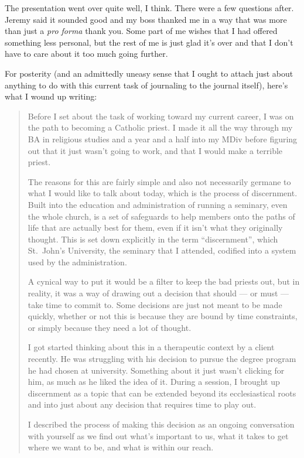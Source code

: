 The presentation went over quite well, I think. There were a few questions after. Jeremy said it sounded good and my boss thanked me in a way that was more than just a \emph{pro forma} thank you. Some part of me wishes that I had offered something less personal, but the rest of me is just glad it's over and that I don't have to care about it too much going further.

For posterity (and an admittedly uneasy sense that I ought to attach just about anything to do with this current task of journaling to the journal itself), here's what I wound up writing:

\begin{quote}
Before I set about the task of working toward my current career, I was on the path to becoming a Catholic priest. I made it all the way through my BA in religious studies and a year and a half into my MDiv before figuring out that it just wasn't going to work, and that I would make a terrible priest.

The reasons for this are fairly simple and also not necessarily germane to what I would like to talk about today, which is the process of discernment. Built into the education and administration of running a seminary, even the whole church, is a set of safeguards to help members onto the paths of life that are actually best for them, even if it isn't what they originally thought. This is set down explicitly in the term ``discernment'', which St.~John's University, the seminary that I attended, codified into a system used by the administration.

A cynical way to put it would be a filter to keep the bad priests out, but in reality, it was a way of drawing out a decision that should --- or must --- take time to commit to. Some decisions are just not meant to be made quickly, whether or not this is because they are bound by time constraints, or simply because they need a lot of thought.

I got started thinking about this in a therapeutic context by a client recently. He was struggling with his decision to pursue the degree program he had chosen at university. Something about it just wasn't clicking for him, as much as he liked the idea of it. During a session, I brought up discernment as a topic that can be extended beyond its ecclesiastical roots and into just about any decision that requires time to play out.

I described the process of making this decision as an ongoing conversation with yourself as we find out what's important to us, what it takes to get where we want to be, and what is within our reach.


\end{quote}
